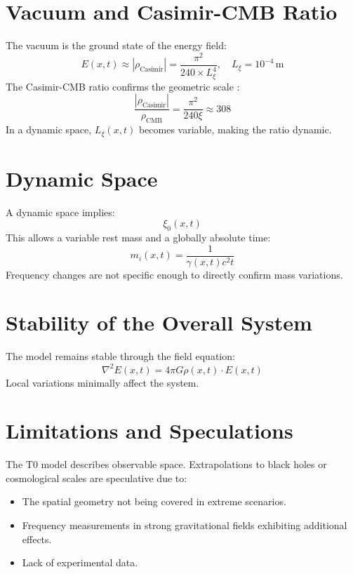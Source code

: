 \documentclass[12pt,a4paper]{article}
\begin{document}
	\section{Vacuum and Casimir-CMB Ratio}
	The vacuum is the ground state of the energy field:
	\begin{equation}
		E(x,t) \approx |\rho_{\text{Casimir}}| = \frac{\pi^2}{240 \times L_\xi^4}, \quad L_\xi = 10^{-4} \, \text{m}
	\end{equation}
	The Casimir-CMB ratio confirms the geometric scale \cite{Casimir1948, Planck2018}:
	\begin{equation}
		\frac{|\rho_{\text{Casimir}}|}{\rho_{\text{CMB}}} = \frac{\pi^2}{240 \xi} \approx 308
	\end{equation}
	In a dynamic space, \(L_\xi(x,t)\) becomes variable, making the ratio dynamic.
	
	\section{Dynamic Space}
	A dynamic space implies:
	\begin{equation}
		\xi_0(x,t)
	\end{equation}
	This allows a variable rest mass and a globally absolute time:
	\begin{equation}
		m_i(x,t) = \frac{1}{\gamma(x,t) c^2 t}
	\end{equation}
	Frequency changes are not specific enough to directly confirm mass variations.
	
	\section{Stability of the Overall System}
	The model remains stable through the field equation:
	\begin{equation}
		\nabla^2 E(x,t) = 4\pi G \rho(x,t) \cdot E(x,t)
	\end{equation}
	Local variations minimally affect the system.
	
	\section{Limitations and Speculations}
	The T0 model describes observable space. Extrapolations to black holes or cosmological scales are speculative due to:
	\begin{itemize}
		\item The spatial geometry not being covered in extreme scenarios.
		\item Frequency measurements in strong gravitational fields exhibiting additional effects.
		\item Lack of experimental data.
	\end{itemize}
	
\end{document}
